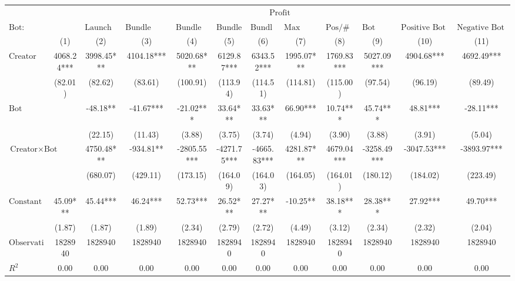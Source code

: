 \begin{tabular}{lccccccccccc}
\hline
 & \multicolumn{11}{c}{$\text{Profit}$} \\
 $\text{Bot}:$ &  & $\text{Launch Bundle}$ & $\text{Bundle Creator Buy}$ & $\text{Bundle Launch}$ & $\text{Bundle Buy}$ & $\text{Bundle Sell}$ & $\text{Max Same Txn}$ & $\text{Pos/\#Swaps}$ & $\text{Bot Comment}$ & $\text{Positive Bot Comment}$ & $\text{Negative Bot Comment}$ \\
 & (1) & (2) & (3) & (4) & (5) & (6) & (7) & (8) & (9) & (10) & (11)\\
\hline
$\text{Creator}$ & 4068.24*** & 3998.45*** & 4104.18*** & 5020.68*** & 6129.87*** & 6343.52*** & 1995.07*** & 1769.83*** & 5027.09*** & 4904.68*** & 4692.49*** \\
 & (82.01) & (82.62) & (83.61) & (100.91) & (113.94) & (114.51) & (114.81) & (115.00) & (97.54) & (96.19) & (89.49) \\
$\text{Bot}$ &  & -48.18** & -41.67*** & -21.02*** & 33.64*** & 33.63*** & 66.90*** & 10.74*** & 45.74*** & 48.81*** & -28.11*** \\
 &  & (22.15) & (11.43) & (3.88) & (3.75) & (3.74) & (4.94) & (3.90) & (3.88) & (3.91) & (5.04) \\
$\text{Creator} \times \text{Bot}$ &  & 4750.48*** & -934.81** & -2805.55*** & -4271.75*** & -4665.83*** & 4281.87*** & 4679.04*** & -3258.49*** & -3047.53*** & -3893.97*** \\
 &  & (680.07) & (429.11) & (173.15) & (164.09) & (164.03) & (164.05) & (164.01) & (180.12) & (184.02) & (223.49) \\
$\text{Constant}$ & 45.09*** & 45.44*** & 46.24*** & 52.73*** & 26.52*** & 27.27*** & -10.25** & 38.18*** & 28.38*** & 27.92*** & 49.70*** \\
 & (1.87) & (1.87) & (1.89) & (2.34) & (2.79) & (2.72) & (4.49) & (3.12) & (2.34) & (2.32) & (2.04) \\
$\text{Observations}$ & 1828940 & 1828940 & 1828940 & 1828940 & 1828940 & 1828940 & 1828940 & 1828940 & 1828940 & 1828940 & 1828940 \\
$R^2$ & 0.00 & 0.00 & 0.00 & 0.00 & 0.00 & 0.00 & 0.00 & 0.00 & 0.00 & 0.00 & 0.00 \\
\hline
\end{tabular}